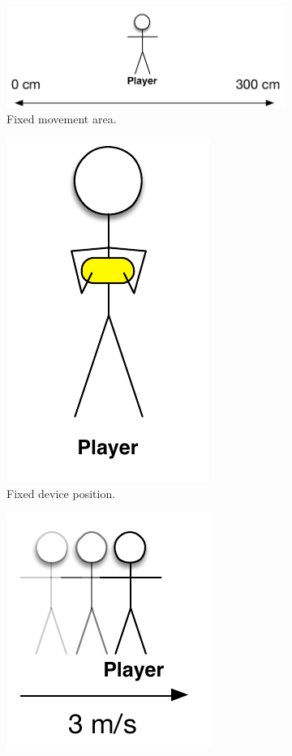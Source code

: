 \begin{figure}[h]
	\centering
	\begin{subfigure}[b]{0.45\textwidth}
		\centering
		\includegraphics[scale = 0.45]{media/constraints/02-fixed-movement-area}
		\caption{Fixed movement area.}
		\label{figure:fixed-movement-area}
	\end{subfigure}
	\qquad
	\begin{subfigure}[b]{0.45\textwidth}
		\centering
		\includegraphics[scale = 0.45]{media/constraints/05-fixed-device-position}
		\caption{Fixed device position.}
		\label{figure:fixed-device-position}
	\end{subfigure}
	\begin{subfigure}[b]{0.45\textwidth}
		\centering
		\includegraphics[scale = 0.45]{media/constraints/06-maximum-velocity}

\end{subfigure}
\end{figure}
